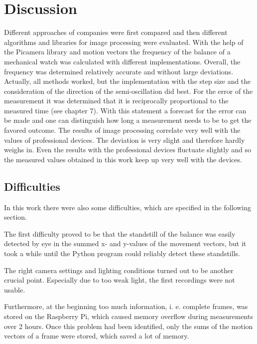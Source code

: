 \documentclass[12pt, a4paper]{report}
\begin{document}
    \chapter{Discussion}
    Different approaches of companies were first compared and then different algorithms and libraries for image processing were evaluated. 
    \newline
    With the help of the Picamera library and motion vectors the frequency of the balance of a mechanical watch was calculated with different implementations. Overall, the frequency was determined relatively accurate and without large deviations. Actually, all methods worked, but the implementation with the step size and the consideration of the direction of the semi-oscillation did best.
    \newline
    For the error of the measurement it was determined that it is reciprocally proportional to the measured time (see chapter 7). With this statement a forecast for the error can be made and one can distinguish how long a measurement needs to be to get the favored outcome.
    \newline
    The results of image processing correlate very well with the values of professional devices. The deviation is very slight and therefore hardly weighs in. Even the results with the professional devices fluctuate slightly and so the measured values obtained in this work keep up very well with the devices. 

    \section{Difficulties}
In this work there were also some difficulties, which are specified in the following section.

The first difficulty proved to be that the standstill of the balance was easily detected by eye in the summed x- and y-values of the movement vectors, but it took a while until the Python program could reliably detect these standstills.

The right camera settings and lighting conditions turned out to be another crucial point. Especially due to too weak light, the first recordings were not usable. 

Furthermore, at the beginning too much information, i. e. complete frames, was stored on the Raspberry Pi, which caused memory overflow during measurements over 2 hours. Once this problem had been identified, only the sums of the motion vectors of a frame were stored, which saved a lot of memory.
\end{document}
